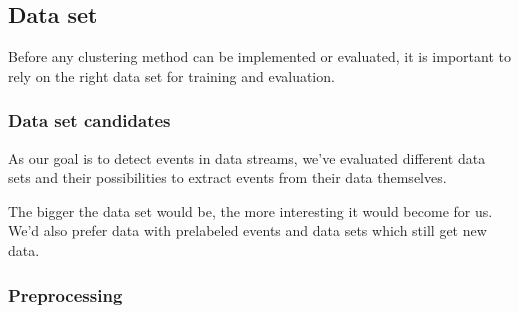 \subsection{Data set}

Before any clustering method can be implemented or evaluated,
it is important to rely on the right data set for training and evaluation.

\iffalse
As our goal is to detect events in news data streams, we've looked for data sets containing
news articles and if possible, if they're somehow assigned to a \textit{story}.
A story, for example, could be \textit{Brexit}.
Any new news article writing about \textit{Brexit} would be a new event in this story.
\fi

\subsubsection{Data set candidates}
As our goal is to detect events in data streams, we've evaluated different data sets and
their possibilities to extract events from their data themselves.

The bigger the data set would be, the more interesting it would become for us.
We'd also prefer data with prelabeled events and data sets which still get new data.

\subsubsection{Preprocessing}



